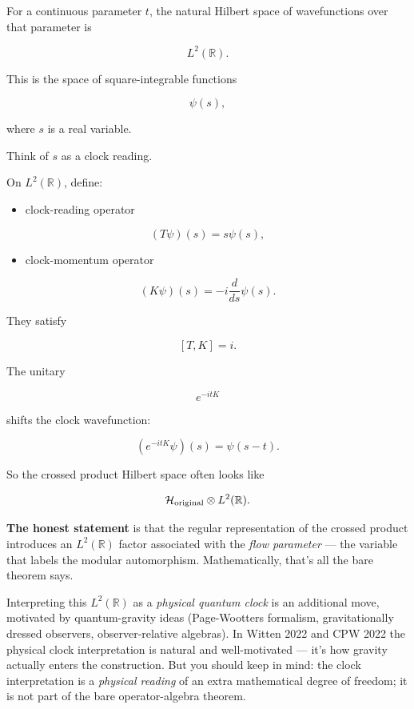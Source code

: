 \documentclass[11pt,a4paper]{article}
\begin{document}
For a continuous parameter $t$, the natural Hilbert space of wavefunctions over that parameter is

\[
L^2(\mathbb{R}).
\]

This is the space of square-integrable functions

\[
\psi(s),
\]

where $s$ is a real variable.

Think of $s$ as a clock reading.

On $L^2(\mathbb{R})$, define:

\begin{itemize}
  \item clock-reading operator
\end{itemize}

\[
(T\psi)(s)=s\psi(s),
\]

\begin{itemize}
  \item clock-momentum operator
\end{itemize}

\[
(K\psi)(s)=-i\frac{d}{ds}\psi(s).
\]

They satisfy

\[
[T,K]=i.
\]

The unitary

\[
e^{-itK}
\]

shifts the clock wavefunction:

\[
(e^{-itK}\psi)(s)=\psi(s-t).
\]

So the crossed product Hilbert space often looks like

\[
\mathcal{H}_{\rm original}\otimes L^2(\mathbb{R}).
\]

\textbf{The honest statement} is that the regular representation of the crossed product introduces an $L^2(\mathbb{R})$ factor associated with the \emph{flow parameter} — the variable that labels the modular automorphism. Mathematically, that's all the bare theorem says.

Interpreting this $L^2(\mathbb{R})$ as a \emph{physical quantum clock} is an additional move, motivated by quantum-gravity ideas (Page-Wootters formalism, gravitationally dressed observers, observer-relative algebras). In Witten 2022 and CPW 2022 the physical clock interpretation is natural and well-motivated — it's how gravity actually enters the construction. But you should keep in mind: the clock interpretation is a \emph{physical reading} of an extra mathematical degree of freedom; it is not part of the bare operator-algebra theorem.
\end{document}

